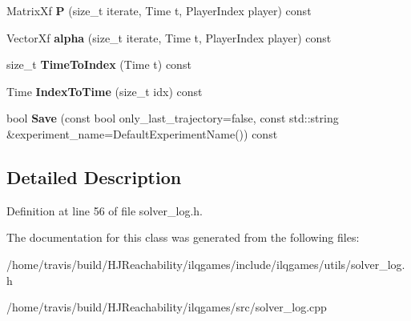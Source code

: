 \begin{DoxyCompactItemize}
\item 
Matrix\+Xf {\bfseries P} (size\+\_\+t iterate, Time t, Player\+Index player) const \hypertarget{classilqgames_1_1_solver_log_a9074054ada0fbcc9b59b073d65252dd7}{}\label{classilqgames_1_1_solver_log_a9074054ada0fbcc9b59b073d65252dd7}

\item 
Vector\+Xf {\bfseries alpha} (size\+\_\+t iterate, Time t, Player\+Index player) const \hypertarget{classilqgames_1_1_solver_log_ac621cbe5639cf7ed168677404311efed}{}\label{classilqgames_1_1_solver_log_ac621cbe5639cf7ed168677404311efed}

\item 
size\+\_\+t {\bfseries Time\+To\+Index} (Time t) const \hypertarget{classilqgames_1_1_solver_log_ac4e09ac795276835d047795ff4ebffc7}{}\label{classilqgames_1_1_solver_log_ac4e09ac795276835d047795ff4ebffc7}

\item 
Time {\bfseries Index\+To\+Time} (size\+\_\+t idx) const \hypertarget{classilqgames_1_1_solver_log_a5ab947d807b26ae2f10663e34af24f23}{}\label{classilqgames_1_1_solver_log_a5ab947d807b26ae2f10663e34af24f23}

\item 
bool {\bfseries Save} (const bool only\+\_\+last\+\_\+trajectory=false, const std\+::string \&experiment\+\_\+name=Default\+Experiment\+Name()) const \hypertarget{classilqgames_1_1_solver_log_a84bc6c185655379e61535a9ad51263ca}{}\label{classilqgames_1_1_solver_log_a84bc6c185655379e61535a9ad51263ca}

\end{DoxyCompactItemize}


\subsection{Detailed Description}


Definition at line 56 of file solver\+\_\+log.\+h.



The documentation for this class was generated from the following files\+:\begin{DoxyCompactItemize}
\item 
/home/travis/build/\+H\+J\+Reachability/ilqgames/include/ilqgames/utils/solver\+\_\+log.\+h\item 
/home/travis/build/\+H\+J\+Reachability/ilqgames/src/solver\+\_\+log.\+cpp\end{DoxyCompactItemize}
